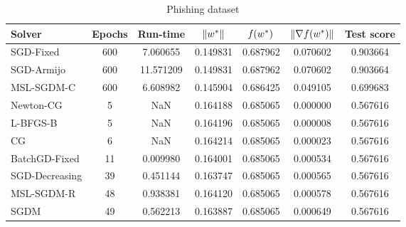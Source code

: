 \begin{table}
\caption{Phishing dataset}
\label{tab:phish-tab}
\centering
\begin{tabular}{lS[drop-zero-decimal]S[round-precision=4]S[round-precision=6]S[round-precision=6]S[exponent-mode=scientific]S[round-precision=6]}
\toprule
Solver & {Epochs} & {Run-time} & {$\lVert w^\ast\rVert$} & {$\operatorname*{\mathit{f}}(w^\ast)$} & {$\lVert\nabla f(w^\ast)\rVert$} & {Test score} \\
\midrule
SGD-Fixed & 600 & 7.060655 & 0.149831 & 0.687962 & 0.070602 & 0.903664 \\
SGD-Armijo & 600 & 11.571209 & 0.149831 & 0.687962 & 0.070602 & 0.903664 \\
MSL-SGDM-C & 600 & 6.608982 & 0.145904 & 0.686425 & 0.049105 & 0.699683 \\
Newton-CG & 5 & NaN & 0.164188 & 0.685065 & 0.000000 & 0.567616 \\
L-BFGS-B & 5 & NaN & 0.164196 & 0.685065 & 0.000008 & 0.567616 \\
CG & 6 & NaN & 0.164214 & 0.685065 & 0.000023 & 0.567616 \\
BatchGD-Fixed & 11 & 0.009980 & 0.164001 & 0.685065 & 0.000534 & 0.567616 \\
SGD-Decreasing & 39 & 0.451144 & 0.163747 & 0.685065 & 0.000565 & 0.567616 \\
MSL-SGDM-R & 48 & 0.938381 & 0.164120 & 0.685065 & 0.000578 & 0.567616 \\
SGDM & 49 & 0.562213 & 0.163887 & 0.685065 & 0.000649 & 0.567616 \\
\bottomrule
\end{tabular}
\end{table}


